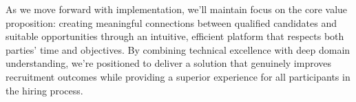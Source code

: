 \documentclass[12pt,a4paper]{article}
\begin{document}
As we move forward with implementation, we'll maintain focus on the core value proposition: creating meaningful connections between qualified candidates and suitable opportunities through an intuitive, efficient platform that respects both parties' time and objectives. By combining technical excellence with deep domain understanding, we're positioned to deliver a solution that genuinely improves recruitment outcomes while providing a superior experience for all participants in the hiring process.



\end{document}
